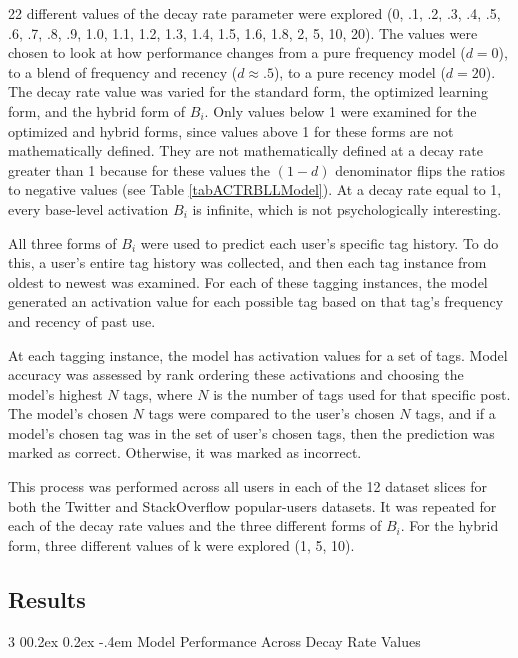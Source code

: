 \documentclass[man,floatsintext,donotrepeattitle]{apa6}
\makeatletter
\renewcommand{\subsubsection}{%
  \@startsection
  {subsubsection}%
  {3}%
  {\parindent}%
  {0\baselineskip \@plus 0.2ex \@minus 0.2ex}%
  {-.4em}%
  {\normalfont\normalsize\bfseries\addperi}}
\makeatother
\begin{document}
22 different values of the decay rate parameter were explored
(0, .1, .2, .3, .4, .5, .6, .7, .8, .9, 1.0, 1.1, 1.2, 1.3, 1.4, 1.5, 1.6, 1.8, 2, 5, 10, 20).
The values were chosen to look at how performance changes from a pure frequency model ($d=0$), to a blend of frequency and recency ($d \approx .5$), to a pure recency model ($d=20$).
The decay rate value was varied for the standard form, the optimized learning form, and the hybrid form of $B_{i}$. 
Only values below 1 were examined for the optimized and hybrid forms, since values above 1 for these forms are not mathematically defined. 
They are not mathematically defined at a decay rate greater than 1 because for these values the $(1-d)$ denominator flips the ratios to negative values (see Table \ref{tabACTRBLLModel}).
At a decay rate equal to 1, every base-level activation $B_{i}$ is infinite, which is not psychologically interesting.

All three forms of $B_{i}$ were used to predict each user's specific tag history.
To do this, a user's entire tag history was collected, and then each tag instance from oldest to newest was examined.
For each of these tagging instances, the model generated an activation value for each possible tag based on that tag's frequency and recency of past use. 

At each tagging instance, the model has activation values for a set of tags.
Model accuracy was assessed by rank ordering these activations and choosing the model's highest $N$ tags, where $N$ is the number of tags used for that specific post.
The model's chosen $N$ tags were compared to the user's chosen $N$ tags, and if a model's chosen tag was in the set of user's chosen tags, then the prediction was marked as correct.
Otherwise, it was marked as incorrect.

This process was performed across all users in each of the 12 dataset slices for both the Twitter and StackOverflow popular-users datasets.
It was repeated for each of the decay rate values and the three different forms of $B_{i}$.
For the hybrid form, three different values of k were explored (1, 5, 10).

\subsection{Results}

\subsubsection{Model Performance Across Decay Rate Values}
\end{document}
